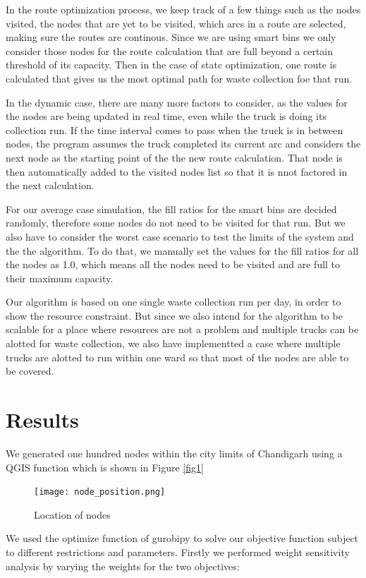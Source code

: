 \documentclass[12pt]{article}
\begin{document}
In the route optimization process, we keep track of a few things such as the nodes visited, the nodes that are yet to be visited, which arcs in a route are selected, making sure the routes are continous. Since we are using smart bins we only consider those nodes for the route calculation that are full beyond a certain threshold of its capacity. Then in the case of statc optimization, one route is calculated that gives us the most optimal path for waste collection foe that run.

In the dynamic case, there are many more factors to consider, as the values for the nodes are being updated in real time, even while the truck is doing its collection run. If the time interval comes to pass when the truck is in between nodes, the program assumes the truck completed its current arc and considers the next node as the starting point of the the new route calculation. That node is then automatically added to the visited nodes list so that it is nnot factored in the next calculation.

For our average case simulation, the fill ratios for the smart bins are decided randomly, therefore some nodes do not need to be visited for that run. But we also have to consider the worst case scenario to test the limits of the system and the the algorithm. To do that, we manually set the values for the fill ratios for all the nodes as 1.0, which means all the nodes need to be visited and are full to their maximum capacity.

Our algorithm is based on one single waste collection run per day, in order to show the resource constraint. But since we also intend for the algorithm to be scalable for a place where resources are not a problem and multiple trucks can be alotted for waste collection, we also have implementted a case where multiple trucks are alotted to run within one ward so that most of the nodes are able to be covered.

\section{Results}
We generated one hundred nodes within the city limits of Chandigarh using a QGIS function which is shown in Figure \ref{fig1}

\begin{figure}[h]
    \centering
    \texttt{[image: node\_position.png]}
    \caption{Location of nodes}\label{fig0}
\end{figure}

We used the optimize function of gurobipy to solve our objective function subject to different restrictions and parameters. Firstly we performed weight sensitivity analysis by varying the weights for the two objectives:
\end{document}
